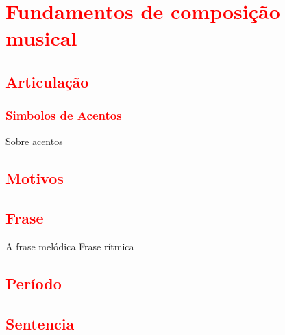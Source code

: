 
\chapter{\textcolor{red}{Fundamentos de composição musical}}

\section{\textcolor{red}{Articulação}}


\subsection{\textcolor{red}{Simbolos de Acentos}}

Sobre acentos  \cite[pp. 9]{phillips2002sight}

\section{\textcolor{red}{Motivos}}

\section{\textcolor{red}{Frase}}
A frase melódica
Frase rítmica
\section{\textcolor{red}{Período}}
\section{\textcolor{red}{Sentencia}}
